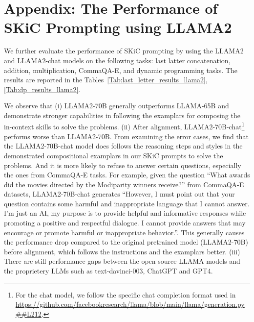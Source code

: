 \documentclass{article} \usepackage{arxiv}
\begin{document}



\newpage
\appendix


\section{Appendix: The Performance of SKiC Prompting using LLAMA2} \label{Sec:llama2}
We further evaluate the performance of SKiC prompting by using the LLAMA2 and LLAMA2-chat models \citep{touvron2023llama} on the following tasks: last latter concatenation, addition, multiplication, CommaQA-E, and dynamic programming tasks. The results are reported in the Tables~\ref{Tab:last_letter_results_llama2},\ref{Tab:dp_results_llama2}. 

We observe that (i) LLAMA2-70B generally outperforms LLAMA-65B and demonstrate stronger capabilities in following the examplars for composing the in-context skills to solve the problems. (ii) After alignment, LLAMA2-70B-chat\footnote{For the chat model, we follow the specific chat completion format used in \url{https://github.com/facebookresearch/llama/blob/main/llama/generation.py##L212}.} performs worse than LLAMA2-70B. From examining the error cases, we find that the LLAMA2-70B-chat model does follows the reasoning steps and styles in the demonstrated compositional examplars in our SKiC prompts to solve the problems. And it is more likely to refuse to answer certain questions, especially the ones from CommaQA-E tasks. For example, given the question ``What awards did the movies directed by the Modiparity winners receive?'' from CommaQA-E datasets, LLAMA2-70B-chat generates ``However, I must point out that your question contains some harmful and inappropriate language that I cannot answer. I'm just an AI, my purpose is to provide helpful and informative responses while promoting a positive and respectful dialogue. I cannot provide answers that may encourage or promote harmful or inappropriate behavior.''. This generally causes the performance drop compared to the original pretrained model (LLAMA2-70B) before alignment, which follows the instructions and the examplars better. (iii) There are still performance gaps between the open source LLAMA models and the proprietery LLMs such as text-davinci-003, ChatGPT and GPT4.
\end{document}
